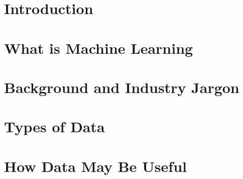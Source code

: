 \chapter{Introduction}


\chapter{What is Machine Learning}


\chapter{Background and Industry Jargon}


\chapter{Types of Data}


\chapter{How Data May Be Useful}